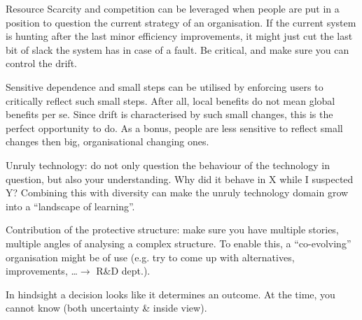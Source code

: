 Resource Scarcity and competition can be leveraged when people are put in a position to question the current strategy of an organisation. 
If the current system is hunting after the last minor efficiency improvements, it might just cut the last bit of slack the system has in case of a fault. 
Be critical, and make sure you can control the drift.

Sensitive dependence and small steps can be utilised by enforcing users to critically reflect such small steps. 
After all, local benefits do not mean global benefits per se.
Since drift is characterised by such small changes, this is the perfect opportunity to do.
As a bonus, people are less sensitive to reflect small changes then big, organisational changing ones.

Unruly technology: do not only question the behaviour of the technology in question, but also your understanding. 
Why did it behave in X while I suspected Y?
Combining this with diversity can make the unruly technology domain grow into a ``landscape of learning''.

Contribution of the protective structure: make sure you have multiple stories, multiple angles of analysing a complex structure. 
To enable this, a ``co-evolving'' organisation might be of use (e.g. try to come up with alternatives, improvements, \ldots $\rightarrow$ R\&D dept.).

In hindsight a decision looks like it determines an outcome. 
At the time, you cannot know (both uncertainty \& inside view). 

